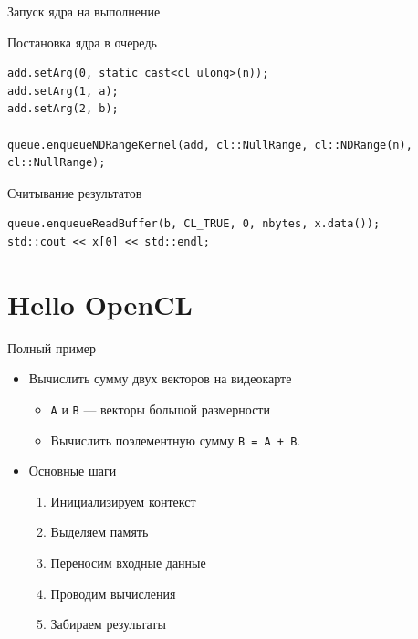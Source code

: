 \documentclass[@BEAMER_OPTIONS@]{beamer}
\newcommand{\code}[1]{\lstinline|#1|}
\begin{document}
\begin{frame}[fragile]{Запуск ядра на выполнение}
    \begin{exampleblock}{Постановка ядра в очередь}
        \begin{lstlisting}
add.setArg(0, static_cast<cl_ulong>(n));
add.setArg(1, a);
add.setArg(2, b);

queue.enqueueNDRangeKernel(add, cl::NullRange, cl::NDRange(n), cl::NullRange);
        \end{lstlisting}
    \end{exampleblock}

    \begin{exampleblock}{Считывание результатов}
        \begin{lstlisting}
queue.enqueueReadBuffer(b, CL_TRUE, 0, nbytes, x.data());
std::cout << x[0] << std::endl;
        \end{lstlisting}
    \end{exampleblock}
\end{frame}

\section{Hello OpenCL}

\begin{frame}{Полный пример}
    \begin{itemize}
        \item Вычислить сумму двух векторов на видеокарте
            \begin{itemize}
                \item \code{A} и \code{B} --- векторы большой размерности
                \item Вычислить поэлементную сумму \code{B = A + B}.
            \end{itemize}
            \vspace{\baselineskip}
        \item Основные шаги
            \begin{enumerate}
                \item Инициализируем контекст
                \item Выделяем память
                \item Переносим входные данные
                \item Проводим вычисления
                \item Забираем результаты
            \end{enumerate}
    \end{itemize}
\end{frame}
\end{document}
